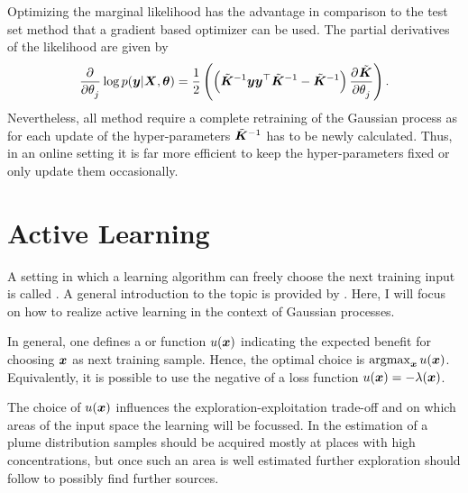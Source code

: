 Optimizing the marginal likelihood has the advantage in comparison to the test 
set method that a gradient based optimizer can be used. The partial derivatives 
of the likelihood are given by
\begin{equation}
    \dpd{}{\theta_j} \log p(\vc y | \mat X, \vc\theta) = \frac{1}{2} 
    \del{\del{\tilde{\mat K}^{-1}\vc y \vc y\Tr \tilde{\mat K}^{-1} 
            - \tilde{\mat{K}}^{-1}} \dpd{\tilde{\mat K}}{\theta_j}} \text{.}
\end{equation}
Nevertheless, all method require a complete retraining of the Gaussian process 
as for each update of the hyper-parameters $\tilde{\bm{K}}^{-1}$ has to be newly 
calculated.  Thus, in an online setting it is far more efficient to keep the 
hyper-parameters fixed or only update them occasionally.

\section{Active Learning}\label{sec:utility}
A setting in which a learning algorithm can freely choose the next training 
input is called . A general introduction to the topic 
is provided by \textcite{Settles:2009vo}. Here, I will focus on how to realize 
active learning in the context of Gaussian processes.

In general, one defines a  or  function 
$u(\bm{x})$ indicating the expected benefit for choosing $\bm{x}$ as next training 
sample. Hence, the optimal choice is $\operatorname*{argmax}_{\bm{x}} u(\bm{x})$. Equivalently, 
it is possible to use the negative of a loss function $u(\bm{x}) = - \lambda(\bm{x})$.

The choice of $u(\bm{x})$ influences the exploration-exploitation trade-off and 
on which areas of the input space the learning will be focussed. In the 
estimation of a plume distribution samples should be acquired mostly at places 
with high concentrations, but once such an area is well estimated further 
exploration should follow to possibly find further sources.

